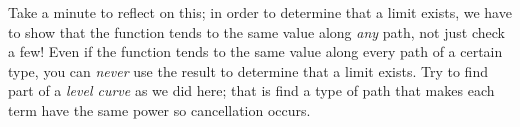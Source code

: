 \documentclass{ximera}
\begin{document}
\begin{exercise}
\begin{exercise}
\begin{exercise}
\begin{exercise}
\begin{feedback}[correct]
Take a minute to reflect on this; in order to determine that a limit exists, we have to show that the function tends to the same value along \emph{any} path, not just check a few! Even if the function tends to the same value along every path of a certain type, you can \emph{never} use the result to determine that a limit exists.  Try to find part of a \emph{level curve} as we did here; that is find a type of path that makes each term have the same power so cancellation occurs. 
\end{feedback}
   \end{exercise}
   \end{exercise}
   \end{exercise}
   \end{exercise}
\end{document}
